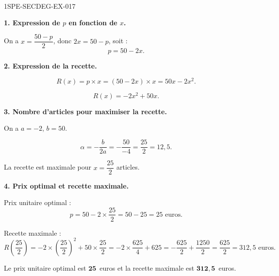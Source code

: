 \begin{corrige}{1SPE-SECDEG-EX-017}

\textbf{1. Expression de $p$ en fonction de $x$.}


On a $x = \dfrac{50 - p}{2}$, donc $2x = 50 - p$, soit :
\[p = 50 - 2x.\]

\medskip
\textbf{2. Expression de la recette.}


\[R(x) = p \times x = (50 - 2x) \times x = 50x - 2x^2.\]

\[\boxed{R(x) = -2x^2 + 50x.}\]

\medskip
\textbf{3. Nombre d'articles pour maximiser la recette.}


On a $a = -2$, $b = 50$.

\[\alpha = -\frac{b}{2a} = -\frac{50}{-4} = \frac{25}{2} = 12{,}5.\]

La recette est maximale pour $x = \dfrac{25}{2}$ articles.

\medskip
\textbf{4. Prix optimal et recette maximale.}


Prix unitaire optimal :
\[p = 50 - 2 \times \frac{25}{2} = 50 - 25 = 25 \text{ euros}.\]

Recette maximale :
\[R\!\left(\frac{25}{2}\right) = -2 \times \left(\frac{25}{2}\right)^2 + 50 \times \frac{25}{2} = -2 \times \frac{625}{4} + 625 = -\frac{625}{2} + \frac{1250}{2} = \frac{625}{2} = 312{,}5 \text{ euros}.\]

Le prix unitaire optimal est $\mathbf{25}$~euros et la recette maximale est $\mathbf{312{,}5}$~euros.

\end{corrige}
